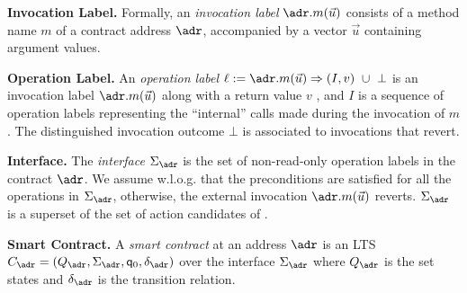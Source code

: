 \noindent
\textbf{Invocation Label.} 
Formally, an \emph{invocation label} $\adr.m(\vec{u})$ consists of a method name $m$ of a contract address $\adr$, accompanied by a vector $\vec{u}$ containing argument values.

\noindent
\textbf{Operation Label.} 
An \emph{operation label} $\ell :=
\adr.m(\vec{u}) \Rightarrow (I,v) \ \cup\ \bot$ is an invocation label $\adr.m(\vec{u})$ along with a
return value $v$ %
, and $I$ is a sequence of operation labels representing the ``internal'' calls made during the invocation of $m$. 
The distinguished invocation outcome $\bot$ is associated to invocations that revert. 


\noindent
\textbf{Interface.}
The \emph{interface} $\Sigma_{\adr}$ is the set of non-read-only operation labels in the contract $\adr$. We assume w.l.o.g. that the preconditions are satisfied for all the operations in $\Sigma_{\adr}$, otherwise, the external invocation $\adr.m(\vec{u})$ reverts. $\Sigma_{\adr}$ is a superset of the set of action candidates of {\name}.  



\noindent
\textbf{Smart Contract.}
A \emph{smart contract} at an address $\adr$ is an LTS $C_{\adr}=(Q_{\adr},\Sigma_{\adr}, \mathsf{q}_0, \delta_{\adr})$ over the interface $\Sigma_{\adr}$ where $Q_{\adr}$ is the set states and $\delta_{\adr}$ is the transition relation.






